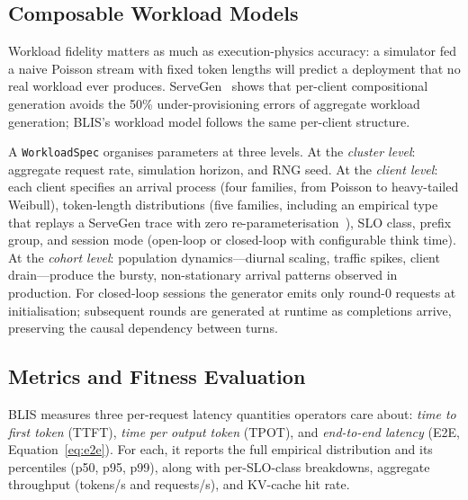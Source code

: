 \documentclass[11pt]{article}
\theoremstyle{plain} %
\theoremstyle{definition} %
\theoremstyle{remark} %
\newcommand{\code}[1]{\texttt{#1}}
\numberwithin{equation}{section}
\begin{document}
\subsection{Composable Workload Models}
\label{subsec:design-workloads}

Workload fidelity matters as much as execution-physics accuracy: a simulator fed
a naive Poisson stream with fixed token lengths will predict a deployment that
no real workload ever produces.
ServeGen~\cite{xiang2025servegen} shows that per-client compositional generation
avoids the 50\% under-provisioning errors of aggregate workload generation;
BLIS's workload model follows the same per-client structure.

A \code{WorkloadSpec} organises parameters at three levels.
At the \emph{cluster level}: aggregate request rate, simulation horizon, and RNG seed.
At the \emph{client level}: each client specifies an arrival process (four
families, from Poisson to heavy-tailed Weibull), token-length distributions
(five families, including an empirical type that replays a ServeGen trace with
zero re-parameterisation~\cite{xiang2025servegen}), SLO class, prefix group,
and session mode (open-loop or closed-loop with configurable think time).
At the \emph{cohort level}: population dynamics---diurnal scaling, traffic spikes,
client drain---produce the bursty, non-stationary arrival patterns observed in
production.
For closed-loop sessions the generator emits only round-0 requests at
initialisation; subsequent rounds are generated at runtime as completions arrive,
preserving the causal dependency between turns.

\subsection{Metrics and Fitness Evaluation}
\label{subsec:design-metrics}

BLIS measures three per-request latency quantities operators care about:
\emph{time to first token} (TTFT), \emph{time per output token} (TPOT), and
\emph{end-to-end latency} (E2E, Equation~\ref{eq:e2e}).
For each, it reports the full empirical distribution and its percentiles (p50,
p95, p99), along with per-SLO-class breakdowns, aggregate throughput (tokens/s
and requests/s), and KV-cache hit rate.
\end{document}
